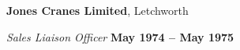\documentclass[10pt]{article}
\renewcommand{\section}[2]%
        {\pagebreak[2]\vspace{1.3\baselineskip}%
         \phantomsection\addcontentsline{toc}{section}{#1}%
         \hspace{0in}%
         \marginpar{
         \raggedright \scshape #1}#2}
\newenvironment{outerlist}[1][\enskip\textbullet]%
        {\begin{itemize}[#1]}{\end{itemize}%
         \vspace{-.6\baselineskip}}
\newenvironment{innerlist}[1][\enskip\textbullet]%
        {\begin{compactitem}[#1]}{\end{compactitem}}
\newcommand{\blankline}{\quad\pagebreak[2]}
\begin{document}
\textbf{Jones Cranes Limited}, Letchworth%
\begin{innerlist}
\item[] \textit{Sales Liaison Officer}%
        \hfill \textbf{May 1974 -- May 1975}
%
%
\end{innerlist}

%
%
%
%
%
%
%
%
%
%
%
%
\end{document}
